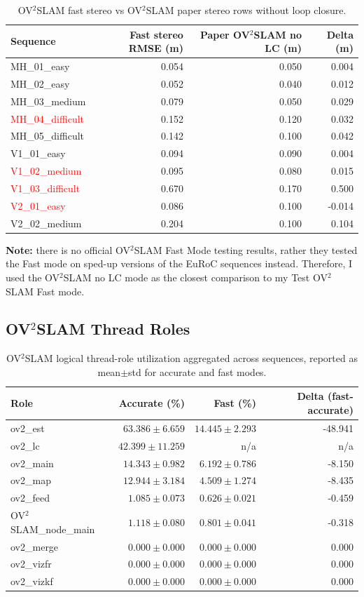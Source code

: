 \documentclass[11pt]{article}
\begin{document}
\begin{table}[H]
\centering
\small
\caption{OV$^{2}$SLAM fast stereo vs OV$^{2}$SLAM paper stereo rows without loop closure.}
\label{tab:ov2_fast_vs_paper}
\begin{tabular}{lrrr}
\toprule
Sequence & Fast stereo RMSE (m) & Paper OV$^{2}$SLAM no LC (m) & Delta (m) \\
\midrule
MH\_01\_easy & 0.054 & 0.050 & 0.004 \\
MH\_02\_easy & 0.052 & 0.040 & 0.012 \\
MH\_03\_medium & 0.079 & 0.050 & 0.029 \\
\textcolor{red}{MH\_04\_difficult} & 0.152 & 0.120 & 0.032 \\
MH\_05\_difficult & 0.142 & 0.100 & 0.042 \\
V1\_01\_easy & 0.094 & 0.090 & 0.004 \\
\textcolor{red}{V1\_02\_medium} & 0.095 & 0.080 & 0.015 \\
\textcolor{red}{V1\_03\_difficult} & 0.670 & 0.170 & 0.500 \\
\textcolor{red}{V2\_01\_easy} & 0.086 & 0.100 & -0.014 \\
V2\_02\_medium & 0.204 & 0.100 & 0.104 \\
\bottomrule
\end{tabular}
\end{table}
\textbf{Note:} there is no official OV$^{2}$SLAM Fast Mode testing results, rather they tested the Fast mode on sped-up versions of the EuRoC sequences instead. Therefore, I used the OV$^{2}$SLAM no LC mode as the closest comparison to my Test OV$^{2}$SLAM Fast mode.

\subsection{OV$^{2}$SLAM Thread Roles}
\begin{table}[H]
\centering
\scriptsize
\caption{OV$^{2}$SLAM logical thread-role utilization aggregated across sequences, reported as mean$\pm$std for accurate and fast modes.}
\label{tab:ov2_role_means_table}
\begin{tabular}{lrrr}
\toprule
Role & Accurate (\%) & Fast (\%) & Delta (fast-accurate) \\
\midrule
ov2\_est & $63.386 \pm 6.659$ & $14.445 \pm 2.293$ & -48.941 \\
ov2\_lc & $42.399 \pm 11.259$ & n/a & n/a \\
ov2\_main & $14.343 \pm 0.982$ & $6.192 \pm 0.786$ & -8.150 \\
ov2\_map & $12.944 \pm 3.184$ & $4.509 \pm 1.274$ & -8.435 \\
ov2\_feed & $1.085 \pm 0.073$ & $0.626 \pm 0.021$ & -0.459 \\
OV$^{2}$SLAM\_node\_main & $1.118 \pm 0.080$ & $0.801 \pm 0.041$ & -0.318 \\
ov2\_merge & $0.000 \pm 0.000$ & $0.000 \pm 0.000$ & 0.000 \\
ov2\_vizfr & $0.000 \pm 0.000$ & $0.000 \pm 0.000$ & 0.000 \\
ov2\_vizkf & $0.000 \pm 0.000$ & $0.000 \pm 0.000$ & 0.000 \\
\bottomrule
\end{tabular}
\end{table}
\end{document}
